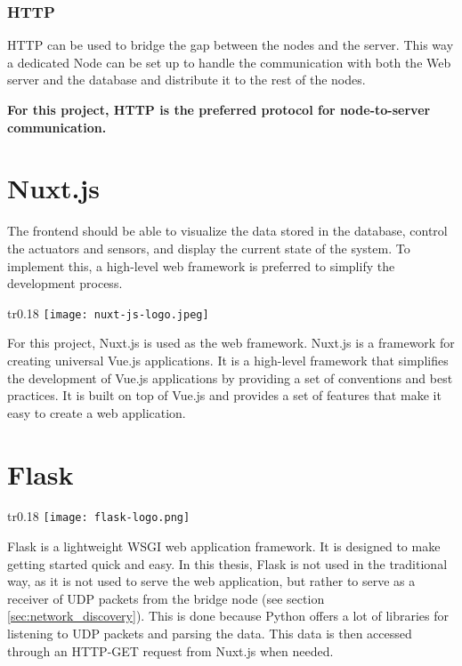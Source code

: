             \subsubsection{HTTP}
            HTTP can be used to bridge the gap between the nodes and the server.
            This way a dedicated Node can be set up to handle the communication
            with both the Web server and the database and distribute it to the 
            rest of the nodes.
        
            \vspace{1cm}
            \textbf{For this project, HTTP is the preferred protocol for 
            node-to-server communication.}


    \section{Nuxt.js}
    The frontend should be able to visualize the data stored in the database,
    control the actuators and sensors, and display the current state of the 
    system. To implement this, a high-level web framework is preferred to 
    simplify the development process. \npar

    \begin{wrapfigure}[2]{tr}{0.18\textwidth} %
        \vspace{-1cm}
        \hspace{3cm}
        \texttt{[image: nuxt-js-logo.jpeg]}
    \end{wrapfigure}
    For this project, Nuxt.js \cite{nuxtjs} is used as the web framework.
    Nuxt.js is a framework for creating universal Vue.js applications.
    It is a high-level framework that simplifies the development of
    Vue.js applications by providing a set of conventions and best practices.
    It is built on top of Vue.js and provides a set of features that
    make it easy to create a web application. 

    \section{Flask}
    \begin{wrapfigure}[5]{tr}{0.18\textwidth} %
        \vspace{-1cm}
        \hspace{3cm}
        \texttt{[image: flask-logo.png]}
    \end{wrapfigure}
    Flask is a lightweight WSGI web application framework. It is 
    designed to make getting started quick and easy. \cite{flask}
    In this thesis, Flask is not used in the traditional way,
    as it is not used to serve the web application, but rather
    to serve as a receiver of UDP packets from the bridge node
    (see section \ref{sec:network_discovery}). This is done 
    because Python offers a lot of libraries for listening to
    UDP packets and parsing the data. This data is then accessed
    through an HTTP-GET request from Nuxt.js when needed.

